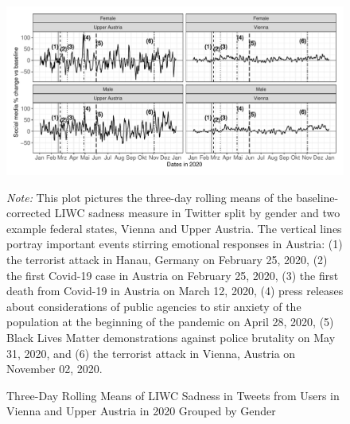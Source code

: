 \documentclass[
  english,
  jou,floatsintext]{apa7}
\begin{document}
\begin{figure}
\caption{Three-Day Rolling Means of LIWC Sadness in Tweets from Users in Vienna and Upper Austria in 2020 Grouped by Gender}\label{fig:Sad-gender-region}
\includegraphics[width=\textwidth]{plots/plt_sadness}

\textit{Note:} This plot pictures the three-day rolling means of the baseline-corrected LIWC sadness measure in Twitter split by gender and two example federal states, Vienna and Upper Austria. The vertical lines portray important events stirring emotional responses in Austria: (1) the terrorist attack in Hanau, Germany on February 25, 2020, (2) the first Covid-19 case in Austria on February 25, 2020, (3) the first death from Covid-19 in Austria on March 12, 2020, (4) press releases about considerations of public agencies to stir anxiety of the population at the beginning of the pandemic on April 28, 2020, (5) Black Lives Matter demonstrations against police brutality on May 31, 2020, and (6) the terrorist attack in Vienna, Austria on November 02, 2020.
\end{figure}
\end{document}
